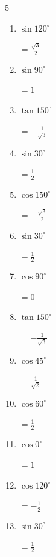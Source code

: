 \begin{multicols}{5}
\begin{enumerate}
  \item $\displaystyle \sin{120^\circ}$

        $\displaystyle =\frac{\sqrt{3}}{2}$

\columnbreak %

  \item $\displaystyle \sin{90^\circ}$

        $\displaystyle =1$

  \item $\displaystyle \tan{150^\circ}$

        $\displaystyle =-\frac{1}{\sqrt{3}}$

  \item $\displaystyle \sin{30^\circ}$

        $\displaystyle =\frac{1}{2}$

  \item $\displaystyle \cos{150^\circ}$

        $\displaystyle =-\frac{\sqrt{3}}{2}$

  \item $\displaystyle \sin{30^\circ}$

        $\displaystyle =\frac{1}{2}$

  \item $\displaystyle \cos{90^\circ}$

        $\displaystyle =0$

  \item $\displaystyle \tan{150^\circ}$

        $\displaystyle =-\frac{1}{\sqrt{3}}$

  \item $\displaystyle \cos{45^\circ}$

        $\displaystyle =\frac{1}{\sqrt{2}}$

  \item $\displaystyle \cos{60^\circ}$

        $\displaystyle =\frac{1}{2}$

  \item $\displaystyle \cos{0^\circ}$

        $\displaystyle =1$

  \item $\displaystyle \cos{120^\circ}$

        $\displaystyle =-\frac{1}{2}$

  \item $\displaystyle \sin{30^\circ}$

        $\displaystyle =\frac{1}{2}$


\end{enumerate}
\end{multicols}
